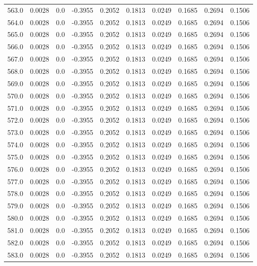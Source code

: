 \begin{longtable}{lrrrrrrrrr}
563.0 & 0.0028 & 0.0 & -0.3955 & 0.2052 & 0.1813 & 0.0249 & 0.1685 & 0.2694 & 0.1506 \\
564.0 & 0.0028 & 0.0 & -0.3955 & 0.2052 & 0.1813 & 0.0249 & 0.1685 & 0.2694 & 0.1506 \\
565.0 & 0.0028 & 0.0 & -0.3955 & 0.2052 & 0.1813 & 0.0249 & 0.1685 & 0.2694 & 0.1506 \\
566.0 & 0.0028 & 0.0 & -0.3955 & 0.2052 & 0.1813 & 0.0249 & 0.1685 & 0.2694 & 0.1506 \\
567.0 & 0.0028 & 0.0 & -0.3955 & 0.2052 & 0.1813 & 0.0249 & 0.1685 & 0.2694 & 0.1506 \\
568.0 & 0.0028 & 0.0 & -0.3955 & 0.2052 & 0.1813 & 0.0249 & 0.1685 & 0.2694 & 0.1506 \\
569.0 & 0.0028 & 0.0 & -0.3955 & 0.2052 & 0.1813 & 0.0249 & 0.1685 & 0.2694 & 0.1506 \\
570.0 & 0.0028 & 0.0 & -0.3955 & 0.2052 & 0.1813 & 0.0249 & 0.1685 & 0.2694 & 0.1506 \\
571.0 & 0.0028 & 0.0 & -0.3955 & 0.2052 & 0.1813 & 0.0249 & 0.1685 & 0.2694 & 0.1506 \\
572.0 & 0.0028 & 0.0 & -0.3955 & 0.2052 & 0.1813 & 0.0249 & 0.1685 & 0.2694 & 0.1506 \\
573.0 & 0.0028 & 0.0 & -0.3955 & 0.2052 & 0.1813 & 0.0249 & 0.1685 & 0.2694 & 0.1506 \\
574.0 & 0.0028 & 0.0 & -0.3955 & 0.2052 & 0.1813 & 0.0249 & 0.1685 & 0.2694 & 0.1506 \\
575.0 & 0.0028 & 0.0 & -0.3955 & 0.2052 & 0.1813 & 0.0249 & 0.1685 & 0.2694 & 0.1506 \\
576.0 & 0.0028 & 0.0 & -0.3955 & 0.2052 & 0.1813 & 0.0249 & 0.1685 & 0.2694 & 0.1506 \\
577.0 & 0.0028 & 0.0 & -0.3955 & 0.2052 & 0.1813 & 0.0249 & 0.1685 & 0.2694 & 0.1506 \\
578.0 & 0.0028 & 0.0 & -0.3955 & 0.2052 & 0.1813 & 0.0249 & 0.1685 & 0.2694 & 0.1506 \\
579.0 & 0.0028 & 0.0 & -0.3955 & 0.2052 & 0.1813 & 0.0249 & 0.1685 & 0.2694 & 0.1506 \\
580.0 & 0.0028 & 0.0 & -0.3955 & 0.2052 & 0.1813 & 0.0249 & 0.1685 & 0.2694 & 0.1506 \\
581.0 & 0.0028 & 0.0 & -0.3955 & 0.2052 & 0.1813 & 0.0249 & 0.1685 & 0.2694 & 0.1506 \\
582.0 & 0.0028 & 0.0 & -0.3955 & 0.2052 & 0.1813 & 0.0249 & 0.1685 & 0.2694 & 0.1506 \\
583.0 & 0.0028 & 0.0 & -0.3955 & 0.2052 & 0.1813 & 0.0249 & 0.1685 & 0.2694 & 0.1506 \\

\end{longtable}
